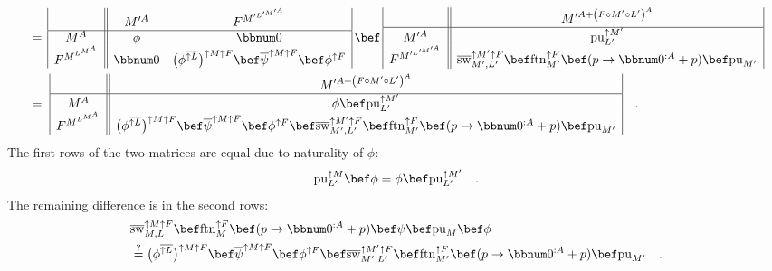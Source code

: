 \begin{align*}
 & =\,\begin{array}{|c||cc|}
 & M^{\prime A} & F^{M^{\prime L^{\prime M^{\prime A}}}}\\
\hline M^{A} & \phi & \bbnum 0\\
F^{M^{L^{M^{A}}}} & \bbnum 0 & \big(\phi^{\overline{\uparrow L}}\big)^{\uparrow M\uparrow F}\bef\overline{\psi}^{\uparrow M\uparrow F}\bef\phi^{\uparrow F}
\end{array}\,\bef\,\begin{array}{|c||c|}
 & M^{\prime A+\left(F\circ M^{\prime}\circ L^{\prime}\right)^{A}}\\
\hline M^{\prime A} & \text{pu}_{L^{\prime}}^{\uparrow M^{\prime}}\\
F^{M^{\prime L^{\prime M^{\prime A}}}} & \overline{\text{sw}}_{M^{\prime},L^{\prime}}^{\uparrow M^{\prime}\uparrow F}\bef\text{ftn}_{M^{\prime}}^{\uparrow F}\bef(p\rightarrow\bbnum 0^{:A}+p)\bef\text{pu}_{M^{\prime}}
\end{array}\\
 & =\,\,\begin{array}{|c||c|}
 & M^{\prime A+\left(F\circ M^{\prime}\circ L^{\prime}\right)^{A}}\\
\hline M^{A} & \phi\bef\text{pu}_{L^{\prime}}^{\uparrow M^{\prime}}\\
F^{M^{L^{M^{A}}}} & \big(\phi^{\overline{\uparrow L}}\big)^{\uparrow M\uparrow F}\bef\overline{\psi}^{\uparrow M\uparrow F}\bef\phi^{\uparrow F}\bef\overline{\text{sw}}_{M^{\prime},L^{\prime}}^{\uparrow M^{\prime}\uparrow F}\bef\text{ftn}_{M^{\prime}}^{\uparrow F}\bef(p\rightarrow\bbnum 0^{:A}+p)\bef\text{pu}_{M^{\prime}}
\end{array}\quad.
\end{align*}
The first rows of the two matrices are equal due to naturality of
$\phi$:
\[
\text{pu}_{L^{\prime}}^{\uparrow M}\bef\phi=\phi\bef\text{pu}_{L^{\prime}}^{\uparrow M^{\prime}}\quad.
\]
The remaining difference is in the second rows:
\begin{align}
 & \overline{\text{sw}}_{M,L}^{\uparrow M\uparrow F}\bef\text{ftn}_{M}^{\uparrow F}\bef(p\rightarrow\bbnum 0^{:A}+p)\bef\psi\bef\text{pu}_{M}\bef\phi\nonumber \\
 & \overset{?}{=}\big(\phi^{\overline{\uparrow L}}\big)^{\uparrow M\uparrow F}\bef\overline{\psi}^{\uparrow M\uparrow F}\bef\phi^{\uparrow F}\bef\overline{\text{sw}}_{M^{\prime},L^{\prime}}^{\uparrow M^{\prime}\uparrow F}\bef\text{ftn}_{M^{\prime}}^{\uparrow F}\bef(p\rightarrow\bbnum 0^{:A}+p)\bef\text{pu}_{M^{\prime}}\quad.\label{eq:monadic-naturality-swap-free-monad-derivation1}
\end{align}

